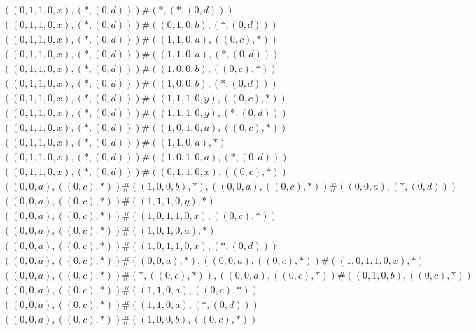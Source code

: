 \begin{align*}
	 & \qquad ((0, 1, 1, 0, x), (*, (0, d))) \# (*, (*, (0, d))) \\ 
	 & \qquad ((0, 1, 1, 0, x), (*, (0, d))) \# ((0, 1, 0, b), (*, (0, d))) \\ 
	 & \qquad ((0, 1, 1, 0, x), (*, (0, d))) \# ((1, 1, 0, a), ((0, c), *)) \\ 
	 & \qquad ((0, 1, 1, 0, x), (*, (0, d))) \# ((1, 1, 0, a), (*, (0, d))) \\ 
	 & \qquad ((0, 1, 1, 0, x), (*, (0, d))) \# ((1, 0, 0, b), ((0, c), *)) \\ 
	 & \qquad ((0, 1, 1, 0, x), (*, (0, d))) \# ((1, 0, 0, b), (*, (0, d))) \\ 
	 & \qquad ((0, 1, 1, 0, x), (*, (0, d))) \# ((1, 1, 1, 0, y), ((0, c), *)) \\ 
	 & \qquad ((0, 1, 1, 0, x), (*, (0, d))) \# ((1, 1, 1, 0, y), (*, (0, d))) \\ 
	 & \qquad ((0, 1, 1, 0, x), (*, (0, d))) \# ((1, 0, 1, 0, a), ((0, c), *)) \\ 
	 & \qquad ((0, 1, 1, 0, x), (*, (0, d))) \# ((1, 1, 0, a), *) \\ 
	 & \qquad ((0, 1, 1, 0, x), (*, (0, d))) \# ((1, 0, 1, 0, a), (*, (0, d))) \\ 
	 & \qquad ((0, 1, 1, 0, x), (*, (0, d))) \# ((0, 1, 1, 0, x), ((0, c), *)) \\ 
	 & \qquad ((0, 0, a), ((0, c), *)) \# ((1, 0, 0, b), *), ((0, 0, a), ((0, c), *)) \# ((0, 0, a), (*, (0, d))) \\ 
	 & \qquad ((0, 0, a), ((0, c), *)) \# ((1, 1, 1, 0, y), *) \\ 
	 & \qquad ((0, 0, a), ((0, c), *)) \# ((1, 0, 1, 1, 0, x), ((0, c), *)) \\ 
	 & \qquad ((0, 0, a), ((0, c), *)) \# ((1, 0, 1, 0, a), *) \\ 
	 & \qquad ((0, 0, a), ((0, c), *)) \# ((1, 0, 1, 1, 0, x), (*, (0, d))) \\ 
	 & \qquad ((0, 0, a), ((0, c), *)) \# ((0, 0, a), *), ((0, 0, a), ((0, c), *)) \# ((1, 0, 1, 1, 0, x), *) \\ 
	 & \qquad ((0, 0, a), ((0, c), *)) \# (*, ((0, c), *)), ((0, 0, a), ((0, c), *)) \# ((0, 1, 0, b), ((0, c), *)) \\ 
	 & \qquad ((0, 0, a), ((0, c), *)) \# ((1, 1, 0, a), ((0, c), *)) \\ 
	 & \qquad ((0, 0, a), ((0, c), *)) \# ((1, 1, 0, a), (*, (0, d))) \\ 
	 & \qquad ((0, 0, a), ((0, c), *)) \# ((1, 0, 0, b), ((0, c), *)) \\ 

\end{align*}
